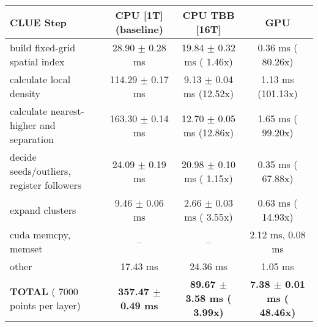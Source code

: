    \begin{tabular}{l|c|c|c}
    \hline
    CLUE Step                                 & CPU [1T] (baseline)         & CPU TBB [16T]                         & GPU                       \\ \hline
    build fixed-grid spatial index            &  28.90 $\pm$  0.28 ms       &  19.84 $\pm$  0.32 ms ( 1.46x)        &   0.36 ms ( 80.26x)       \\
    calculate local density                   & 114.29 $\pm$  0.17 ms       &   9.13 $\pm$  0.04 ms (12.52x)        &   1.13 ms (101.13x)       \\
    calculate nearest-higher and separation   & 163.30 $\pm$  0.14 ms       &  12.70 $\pm$  0.05 ms (12.86x)        &   1.65 ms ( 99.20x)       \\
    decide seeds/outliers, register followers &  24.09 $\pm$  0.19 ms       &  20.98 $\pm$  0.10 ms ( 1.15x)        &   0.35 ms ( 67.88x)       \\
    expand clusters                           &   9.46 $\pm$  0.06 ms       &   2.66 $\pm$  0.03 ms ( 3.55x)        &   0.63 ms ( 14.93x)       \\ \hline
    cuda memcpy, memset                       & --                          & --                                    &   2.12 ms,   0.08 ms      \\ 
    other                                     &  17.43 ms                   &  24.36 ms                             &   1.05 ms                 \\ \hline
    \textbf{TOTAL} ( 7000 points per layer)   & \textbf{357.47 $\pm$  0.49 ms} & \textbf{ 89.67 $\pm$  3.58 ms ( 3.99x)} & \textbf{  7.38 $\pm$  0.01 ms ( 48.46x)}  \\
    \hline 
    \end{tabular}
    \linebreak


